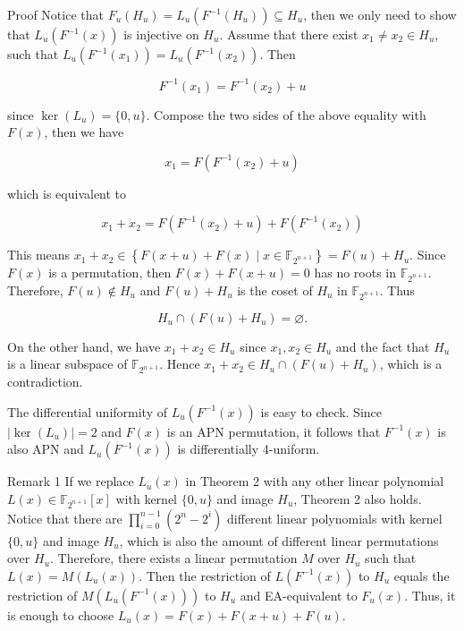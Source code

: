 \documentclass[10pt]{article}
\begin{document}
Proof Notice that $F_{u}\left(H_{u}\right)=L_{u}\left(F^{-1}\left(H_{u}\right)\right) \subseteq H_{u}$, then we only need to show that $L_{u}\left(F^{-1}(x)\right)$ is injective on $H_{u}$. Assume that there exist $x_{1} \neq x_{2} \in H_{u}$, such that $L_{u}\left(F^{-1}\left(x_{1}\right)\right) =L_{u}\left(F^{-1}\left(x_{2}\right)\right)$. Then

$$
F^{-1}\left(x_{1}\right)=F^{-1}\left(x_{2}\right)+u
$$

since $\operatorname{ker}\left(L_{u}\right)=\{0, u\}$. Compose the two sides of the above equality with $F(x)$, then we have

$$
x_{1}=F\left(F^{-1}\left(x_{2}\right)+u\right)
$$

which is equivalent to

$$
x_{1}+x_{2}=F\left(F^{-1}\left(x_{2}\right)+u\right)+F\left(F^{-1}\left(x_{2}\right)\right)
$$

This means $x_{1}+x_{2} \in\left\{F(x+u)+F(x) \mid x \in \mathbb{F}_{2^{n+1}}\right\}=F(u)+H_{u}$. Since $F(x)$ is a permutation, then $F(x)+F(x+u)=0$ has no roots in $\mathbb{F}_{2^{n+1}}$. Therefore, $F(u) \notin H_{u}$ and $F(u)+H_{u}$ is the coset of $H_{u}$ in $\mathbb{F}_{2^{n+1}}$. Thus

$$
H_{u} \cap\left(F(u)+H_{u}\right)=\varnothing .
$$

On the other hand, we have $x_{1}+x_{2} \in H_{u}$ since $x_{1}, x_{2} \in H_{u}$ and the fact that $H_{u}$ is a linear subspace of $\mathbb{F}_{2^{n+1}}$. Hence $x_{1}+x_{2} \in H_{u} \cap\left(F(u)+H_{u}\right)$, which is a contradiction.

The differential uniformity of $L_{u}\left(F^{-1}(x)\right)$ is easy to check. Since $\left|\operatorname{ker}\left(L_{u}\right)\right|=2$ and $F(x)$ is an APN permutation, it follows that $F^{-1}(x)$ is also APN and $L_{u}\left(F^{-1}(x)\right)$ is differentially 4-uniform.

Remark 1 If we replace $L_{u}(x)$ in Theorem 2 with any other linear polynomial $L(x) \in \mathbb{F}_{2^{n+1}}[x]$ with kernel $\{0, u\}$ and image $H_{u}$, Theorem 2 also holds. Notice that there are $\prod_{i=0}^{n-1}\left(2^{n}-2^{i}\right)$ different linear polynomials with kernel $\{0, u\}$ and image $H_{u}$, which is also the amount of different linear permutations over $H_{u}$. Therefore, there exists a linear permutation $M$ over $H_{u}$ such that $L(x)=M\left(L_{u}(x)\right)$. Then the restriction of $L\left(F^{-1}(x)\right)$ to $H_{u}$ equals the restriction of $M\left(L_{u}\left(F^{-1}(x)\right)\right)$ to $H_{u}$ and EA-equivalent to $F_{u}(x)$. Thus, it is enough to choose $L_{u}(x)=F(x)+F(x+u)+F(u)$.
\end{document}
